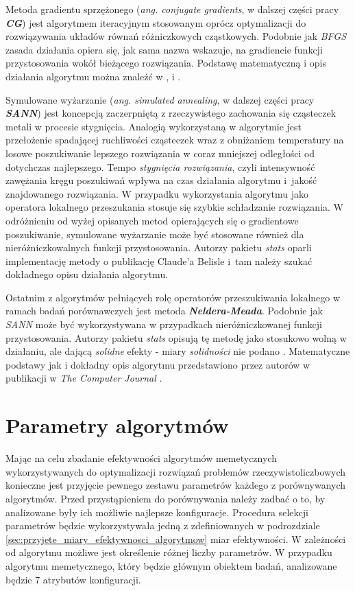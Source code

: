 \par
Metoda gradientu sprzężonego (\emph{ang. conjugate gradients}, w dalszej części pracy \emph{\textbf{CG}}) jest algorytmem iteracyjnym stosowanym oprócz optymalizacji do rozwiązywania układów równań różniczkowych cząstkowych. Podobnie jak \emph{BFGS} zasada działania opiera się, jak sama nazwa wskazuje, na gradiencie funkcji przystosowania wokół bieżącego rozwiązania. Podstawę matematyczną i opis działania algorytmu można znaleźć w \cite{fletcher1964function}, \cite{Nash90a} i \cite{nocedal2006numerical}.
\par
Symulowane wyżarzanie (\emph{ang. simulated annealing}, w dalszej części pracy \emph{\textbf{SANN}}) jest koncepcją zaczerpniętą z rzeczywistego zachowania się cząsteczek metali w procesie stygnięcia. Analogią wykorzystaną w algorytmie jest przełożenie spadającej ruchliwości cząsteczek wraz z obniżaniem temperatury na losowe poszukiwanie lepszego rozwiązania w coraz mniejszej odległości od dotychczas najlepszego. Tempo \emph{stygnięcia rozwiązania}, czyli intensywność zawężania kręgu poszukiwań wpływa na czas działania algorytmu i~jakość znajdowanego rozwiązania. W przypadku wykorzystania algorytmu jako operatora lokalnego przeszukania stosuje się szybkie schładzanie rozwiązania. W odróżnieniu od wyżej opisanych metod opierających się o gradientowe poszukiwanie, symulowane wyżarzanie może być stosowane również dla nieróżniczkowalnych funkcji przystosowania. Autorzy pakietu \emph{stats} oparli implementację metody o publikację Claude'a Belisle \cite{belisle1992convergence} i~tam należy szukać dokładnego opisu działania algorytmu.
\par
Ostatnim z algorytmów pełniących rolę operatorów przeszukiwania lokalnego w ramach  badań porównawczych jest metoda \emph{\textbf{Neldera-Meada}}. Podobnie jak \emph{SANN} może być wykorzystywana w przypadkach nieróżniczkowanej funkcji przystosowania. Autorzy pakietu \emph{stats} opisują tę metodę jako stosukowo wolną w działaniu, ale dającą \emph{solidne} efekty - miary \emph{solidności} nie podano \cite{statsPackage}. Matematyczne podstawy jak i dokładny opis algorytmu przedstawiono przez autorów w publikacji w \emph{The Computer Journal} \cite{nelderMead1965}.


\section{Parametry algorytmów}
\par
Mając na celu zbadanie efektywności algorytmów memetycznych wykorzystywanych do optymalizacji rozwiązań problemów rzeczywistoliczbowych konieczne jest przyjęcie pewnego zestawu parametrów każdego z porównywanych algorytmów. Przed przystąpieniem do porównywania należy zadbać o to, by analizowane były ich możliwie najlepsze konfiguracje. Procedura selekcji parametrów będzie wykorzystywała jedną z zdefiniowanych w podrozdziale \ref{sec:przyjete_miary_efektywnosci_algorytmow} miar efektywności. W zależności od algorytmu możliwe jest określenie różnej liczby parametrów. W przypadku algorytmu memetycznego, który będzie głównym obiektem badań, analizowane będzie 7 atrybutów konfiguracji.
